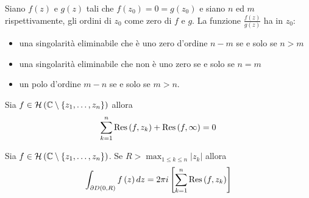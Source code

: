 \begin{thm}
Siano $f(z)$ e $g(z)$ tali che $f\left(z_{0}\right) = 0 = g\left(z_{0}\right)$ e siano $n$ ed $m$ rispettivamente, gli ordini di $z_{0}$ come zero di $f$ e $g$. La funzione $\frac{f(z)}{g(z)}$ ha in $z_{0}$:

\begin{itemize}
\item una singolarità eliminabile che è uno zero d'ordine $n - m$ se e solo se $n > m$
\item una singolarità eliminabile che non è uno zero se e solo se $n = m$
\item un polo d'ordine $m - n$ se e solo se $m > n$.
\end{itemize}
\end{thm}
\begin{thm}
Sia $f\in \mathcal{H} \left(\mathbb{C}  \setminus \left\{z_{1} ,\dotsc ,z_{n}\right\}\right)$ allora
\begin{equation*}
\sum\limits ^{n}_{k = 1}\operatorname{Res} \left(f,z_{k}\right) + \operatorname{Res} \left(f,\infty \right) = 0
\end{equation*}
\end{thm}
\begin{thm}
Sia $f\in \mathcal{H} \left(\mathbb{C}  \setminus \left\{z_{1} ,\dotsc ,z_{n}\right\}\right)$. Se $R > \max_{1\leq k\leq n}\left| z_{k}\right| $ allora
\begin{equation*}
\int\nolimits _{\partial D\left(0,R\right)} f\left(z\right) dz = 2\pi i\left[\sum\limits ^{n}_{k = 1}\operatorname{Res} \left(f,z_{k}\right)\right]
\end{equation*}
\end{thm}
